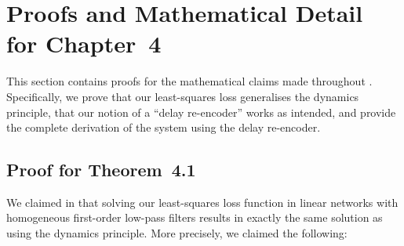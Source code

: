 
\section{Proofs and Mathematical Detail for Chapter~4}
\label{app:temporal_tuning_proofs}

This section contains proofs for the mathematical claims made throughout .
Specifically, we prove that our least-squares loss generalises the \NEF dynamics principle, that our notion of a \enquote{delay re-encoder} works as intended, and provide the complete derivation of the \LDN system using the delay re-encoder.

\subsection{Proof for Theorem~4.1}
\label{app:lstsq_nef_equivalence}

We claimed in  that solving our least-squares loss function in linear networks with homogeneous first-order low-pass filters results in exactly the same solution as using the \NEF dynamics principle.
More precisely, we claimed the following:

\thmTemporalLstsq*

